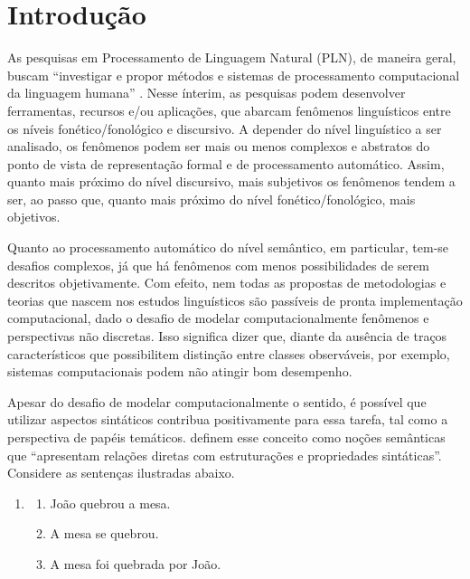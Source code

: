 \section{Introdução}\label{sec-intro}

As pesquisas em Processamento de Linguagem Natural (PLN), de maneira
geral, buscam ``investigar e propor métodos e sistemas de processamento
computacional da linguagem humana'' \cite[p.~10]{caseli2023}. 
Nesse ínterim, as pesquisas podem desenvolver ferramentas, recursos
e/ou aplicações, que abarcam fenômenos linguísticos entre os níveis
fonético/fonológico e discursivo. A depender do nível linguístico a ser
analisado, os fenômenos podem ser mais ou menos complexos e abstratos do
ponto de vista de representação formal e de processamento automático.
Assim, quanto mais próximo do nível discursivo, mais subjetivos os
fenômenos tendem a ser, ao passo que, quanto mais próximo do nível
fonético/fonológico, mais objetivos.

Quanto ao processamento automático do nível semântico, em particular,
tem-se desafios complexos, já que há fenômenos com menos possibilidades
de serem descritos objetivamente. Com efeito, nem todas as propostas de
metodologias e teorias que nascem nos estudos linguísticos são passíveis
de pronta implementação computacional, dado o desafio de modelar
computacionalmente fenômenos e perspectivas não discretas. Isso
significa dizer que, diante da ausência de traços característicos que
possibilitem distinção entre classes observáveis, por exemplo, sistemas
computacionais podem não atingir bom desempenho.

Apesar do desafio de modelar computacionalmente o sentido, é possível
que utilizar aspectos sintáticos contribua positivamente para essa
tarefa, tal como a perspectiva de papéis temáticos. \textcite[p. 39]{cançado2017} definem esse conceito como noções semânticas que
``apresentam relações diretas com estruturações e propriedades
sintáticas''. Considere as sentenças ilustradas abaixo.

\begin{enumerate}[label={(\arabic{enumi})}]
  \item\label{itm1}
    \begin{enumerate}[label=(\arabic{enumi}.\alph*)]
      \item\label{itm1a} João quebrou a mesa.
      \item\label{itm1b} A mesa se quebrou.
      \item\label{itm1c} A mesa foi quebrada por João.
    \end{enumerate}
\end{enumerate}

